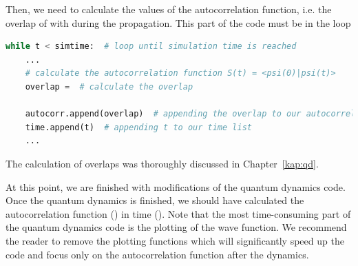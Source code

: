 Then, we need to calculate the values of the autocorrelation function, i.e. the overlap of  with  during the propagation. This part of the code must be in the  loop
\begin{lstlisting}[language=Python, style=mystyle2]
while t < simtime:  # loop until simulation time is reached
    ... 
    # calculate the autocorrelation function S(t) = <psi(0)|psi(t)>
    overlap =  # calculate the overlap

    autocorr.append(overlap)  # appending the overlap to our autocorrelation function list
    time.append(t)  # appending t to our time list
    ...
\end{lstlisting}
The calculation of overlaps was thoroughly discussed in Chapter~\ref{kap:qd}.

At this point, we are finished with modifications of the quantum dynamics code. Once the quantum dynamics is finished, we should have calculated the autocorrelation function () in time (). Note that the most time-consuming part of the quantum dynamics code is the plotting of the wave function. We recommend the reader to remove the plotting functions which will significantly speed up the code and focus only on the autocorrelation function after the dynamics.

